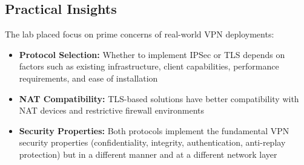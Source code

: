 \subsection{Practical Insights}

The lab placed focus on prime concerns of real-world VPN deployments:

\begin{itemize}
    \item \textbf{Protocol Selection:} Whether to implement IPSec or TLS depends on factors such as existing infrastructure, client capabilities, performance requirements, and ease of installation
    
    \item \textbf{NAT Compatibility:} TLS-based solutions have better compatibility with NAT devices and restrictive firewall environments
    
    \item \textbf{Security Properties:} Both protocols implement the fundamental VPN security properties (confidentiality, integrity, authentication, anti-replay protection) but in a different manner and at a different network layer
    
\end{itemize}
